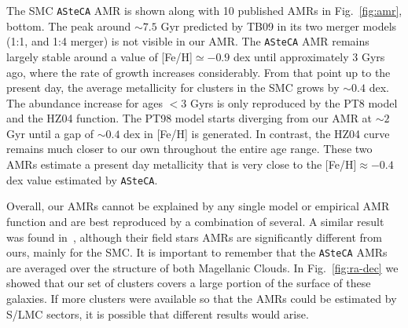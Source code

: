 \documentclass{aa}
\begin{document}
%
The SMC \texttt{ASteCA} AMR is shown along  with 10 published AMRs in
Fig.~\ref{fig:amr}, bottom.
%
%
The peak around ${\sim}7.5$ Gyr predicted by TB09 in its two merger models 
(1:1, and 1:4 merger) is not visible in our AMR.\@
%
The \texttt{ASteCA} AMR remains largely stable around a value of
[Fe/H]${\simeq-}0.9$ dex until approximately 3 Gyrs ago, where the rate of
growth increases considerably. From that point up to the present day, the
average metallicity for clusters in the SMC grows by ${\sim}0.4$ dex.
%
The abundance increase for ages ${<}3$ Gyrs is only reproduced by the PT8
model and the HZ04 function.
The PT98 model starts diverging from our AMR at ${\sim}2$ Gyr until a gap of
${\sim}0.4$ dex in [Fe/H] is generated. In contrast, the HZ04 curve remains
much closer to our own throughout the entire age range. These two AMRs estimate
a present day metallicity that is very close to the [Fe/H]${\approx}-0.4$ dex value
estimated by \texttt{ASteCA}.


Overall, our AMRs cannot be explained by any single model or empirical AMR
function and are best reproduced by a combination of several. A similar result
was found in~\cite{Piatti_Geisler_2013}, although their field stars AMRs are
significantly different from ours, mainly for the SMC.\@
%
It is important to remember that the \texttt{ASteCA} AMRs are averaged over the
structure of both Magellanic Clouds. In Fig.~\ref{fig:ra-dec} we showed that our
set of clusters covers a large portion of the surface of these galaxies.
%
If more clusters were available so that the AMRs could be estimated by S/LMC
sectors, it is possible that different results would arise.
\end{document}
